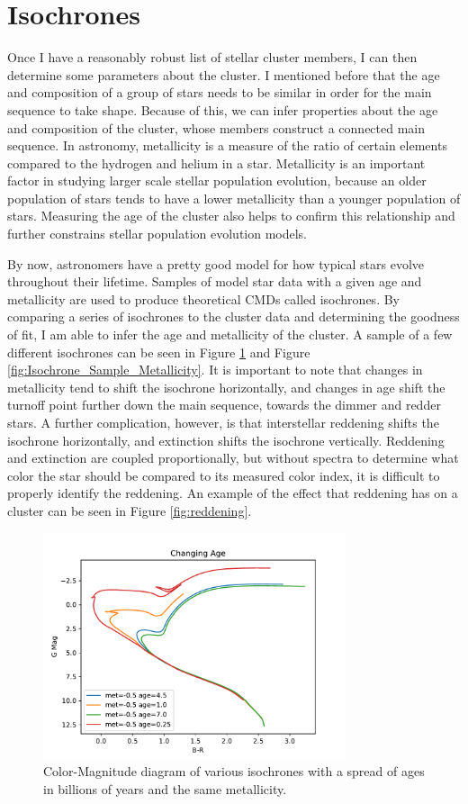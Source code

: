 \documentclass[aps,prb,twocolumn,groupedaddress,nofootinbib,floatfix]{revtex4-1}
\begin{document}
\section*{Isochrones}
Once I have a reasonably robust list of stellar cluster members, I can then determine some parameters about the cluster. I mentioned before that the age and composition of a group of stars needs to be similar in order for the main sequence to take shape. Because of this, we can infer properties about the age and composition of the cluster, whose members construct a connected main sequence. In astronomy, metallicity is a measure of the ratio of certain elements compared to the hydrogen and helium in a star. Metallicity is an important factor in studying larger scale stellar population evolution, because an older population of stars tends to have a lower metallicity than a younger population of stars. Measuring the age of the cluster also helps to confirm this relationship and further constrains stellar population evolution models.

By now, astronomers have a pretty good model for how typical stars evolve throughout their lifetime. Samples of model star data with a given age and metallicity are used to produce theoretical CMDs called isochrones. By comparing a series of isochrones to the cluster data and determining the goodness of fit, I am able to infer the age and metallicity of the cluster. A sample of a few different isochrones can be seen in Figure \ref{fig:Isochrone_Sample_Age} and Figure \ref{fig:Isochrone_Sample_Metallicity}. It is important to note that changes in metallicity tend to shift the isochrone horizontally, and changes in age shift the turnoff point further down the main sequence, towards the dimmer and redder stars. A further complication, however, is that interstellar reddening shifts the isochrone horizontally, and extinction shifts the isochrone vertically. Reddening and extinction are coupled proportionally, but without spectra to determine what color the star should be compared to its measured color index, it is difficult to properly identify the reddening. An example of the effect that reddening has on a cluster can be seen in Figure \ref{fig:reddening}.

\begin{figure}[!h]
	\centering
      \includegraphics[width=3.5in]{iso_sample_age.pdf}
	\caption{Color-Magnitude diagram of various isochrones with a spread of ages in billions of years and the same metallicity.}
	\label{fig:Isochrone_Sample_Age}
\end{figure}
\end{document}
